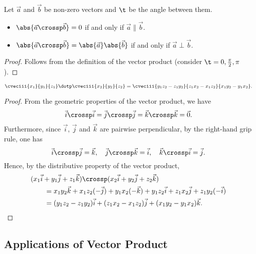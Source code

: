 \begin{proposition}
    Let $\vec a$ and $\vec b$ be non-zero vectors and $\t$ be the angle between them.
    \begin{itemize}
        \item $\abs{\vec a \crossp \vec b} = 0$ if and only if $\vec a \parallel \vec b$.
        \item $\abs{\vec a \crossp \vec b} = \abs{\vec a} \abs{\vec b}$ if and only if $\vec a \perp \vec b$.
    \end{itemize}
\end{proposition}
\begin{proof}
    Follows from the definition of the vector product (consider $\t = 0, \frac\pi2, \pi$).
\end{proof}

\begin{proposition}
    \[\cveciii{x_1}{y_1}{z_1} \dotp \cveciii{x_2}{y_2}{z_2} = \cveciii{y_1 z_2 - z_1 y_2}{z_1 x_2 - x_1 z_2}{x_1 y_2 - y_1 x_2}.\]
\end{proposition}
\begin{proof}
    From the geometric properties of the vector product, we have \[\vec i \crossp \vec i = \vec j \crossp \vec j = \vec k \crossp \vec k = \vec 0.\] Furthermore, since $\vec i$, $\vec j$ and $\vec k$ are pairwise perpendicular, by the right-hand grip rule, one has \[\vec i \crossp \vec j = \vec k, \quad \vec j \crossp \vec k = \vec i, \quad \vec k \crossp \vec i = \vec j.\] Hence, by the distributive property of the vector product,
    \begin{align*}
        &(x_1 \vec i + y_1 \vec j + z_1 \vec k) \crossp (x_2 \vec i + y_2 \vec j + z_2 \vec k) \\
        &\hspace{2em}= x_1 y_2 \vec k + x_1 z_2 (-\vec j) + y_1 x_2 (-\vec k) + y_1 z_2 \vec i + z_1 x_2 \vec j + z_1 y_2 (-\vec i) \\
        &\hspace{2em}=(y_1 z_2 - z_1 y_2) \vec i + (z_1 x_2 - x_1 z_2) \vec j + (x_1 y_2 - y_1 x_2) \vec k.
    \end{align*}
\end{proof}

\subsection{Applications of Vector Product}

